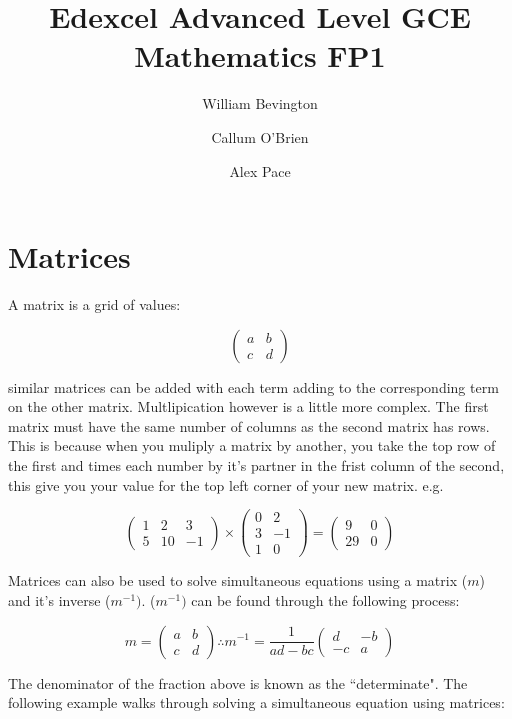 \documentclass{article}
\title{Edexcel Advanced Level GCE Mathematics FP1}
\author{William Bevington \and Callum O'Brien \and Alex Pace}
\date{}
\begin{document}
\maketitle
\tableofcontents
\newpage

\section{Matrices}
A matrix is a grid of values:

\[\left(\begin{array}{cc} a & b \\ c & d \end{array}\right)\]

similar matrices can be added with each term adding to the corresponding term on the other matrix. Multlipication however is a little more complex. The first matrix must have the same number of columns as the second matrix has rows. This is because when you muliply a matrix by another, you take the top row of the first and times each number by it's partner in the frist column of the second, this give you your value for the top left corner of your new matrix. e.g.

\[\left(\begin{array}{ccc} 1 & 2 & 3 \\ 5 & 10 & -1 \end{array}\right) \times \left(\begin{array}{cc} 0 & 2 \\ 3 & -1 \\ 1 & 0 \end{array}\right) = \left(\begin{array}{cc} 9 & 0 \\ 29 & 0 \end{array}\right)\]

Matrices can also be used to solve simultaneous equations using a matrix (\(m\)) and it's inverse (\(m^{-1})\). (\(m^{-1})\) can be found through the following process:

\[m=\left(\begin{array}{cc} a & b \\ c & d \end{array}\right) \therefore m^{-1} = \frac{1}{ad-bc}\left(\begin{array}{cc} d & -b \\ -c & a \end{array}\right)\]

The denominator of the fraction above is known as the ``determinate". The following example walks through solving a simultaneous equation using matrices:
\end{document}
